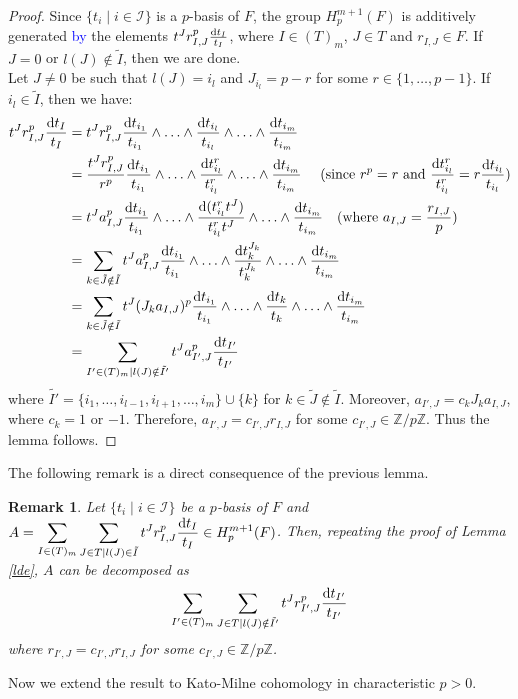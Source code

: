 \documentclass[times,10pt]{amsart}
\newcommand{\Z}{\ensuremath{\mathbb{Z}}}
\newcommand{\dd}{{\rm d}}
\newcommand{\I}{\ensuremath{\mathcal{I}}}
\newtheorem{rem}[thm]{Remark}%
\begin{document}
    \begin{proof}
         Since $\{ t_i\mid i\in \I\}$ is a $p$-basis of $F$, {the group $ H_p^{m+1}(F)$ is additively generated \textcolor{blue}{by} the  elements  $ t^J r^p_{I,J} \frac{\dd t_I}{t_I}$,} where  $ I\in (T)_m$,  $ J\in T$ and $r_{I,J}\in F$. If $J=0$ or $l(J)\notin \tilde{I}$, then we are done. \\
         Let  $J\neq 0$ be such that   $ l(J)=i_l$ and $ J_{i_l}=p-r$ for some $r\in \{1,\ldots,p-1\}$. If $i_l\in \tilde{I}$, then we  have:
         \begin{align*}
             t^J r^p_{I,J} \frac{\dd t_I}{t_I}&= t^J r^p_{I,J} \frac{\dd t_{i_1}}{t_{i_1}}\wedge \ldots\wedge \frac{\dd t_{i_l}}{t_{i_l}}\wedge \ldots\wedge \frac{\dd t_{i_m}}{t_{i_m}}\\&= \frac{t^J  r^p_{I,J}}{r^p} \frac{\dd t_{i_1}}{t_{i_1}}\wedge \ldots\wedge \frac{\dd t_{i_l}^r}{t^r_{i_l}}\wedge \ldots\wedge \frac{\dd t_{i_m}}{t_{i_m}}\quad \text{ (since $ r^p=r$ and $ \frac{\dd t^r_{i_l}}{t^r_{i_l}}= r\frac{\dd t_{i_l}}{t_{i_l}}$)}\\&= t^J {a^p_{I,J}} \frac{\dd t_{i_1}}{t_{i_1}}\wedge\ldots\wedge \frac{\dd (t^r_{i_l}t^J)}{t^r_{i_l}t^J}\wedge\ldots\wedge \frac{\dd t_{i_m}}{t_{i_m}}\quad \text{(where $a_{I,J}= \frac{r_{I,J}}{p}$)}\\&=\sum_{k\in \tilde{J}\notin \tilde{I}} t^Ja^p_{I,J} \frac{\dd t_{i_1}}{t_{i_1}}\wedge \ldots\wedge \frac{\dd t_k^{J_k}}{t_k^{J_k}}\wedge \ldots\wedge \frac{\dd t_{i_m}}{t_{i_m}}\\&=\sum_{k\in \tilde{J}\notin \tilde{I}}t^J (J_k a_{I,J})^p \frac{\dd t_{i_1}}{t_{i_1}}\wedge \ldots\wedge \frac{\dd t_k}{t_k}\wedge \ldots\wedge \frac{\dd t_{i_m}}{t_{i_m}}\\&= \sum_{I'\in (T)_m\mid l(J)\notin \tilde{I'}}  t^J a^p_{I',J}\frac{\dd t_{I'}}{t_{I'}}
         \end{align*}  where   $\tilde{I'}=\{ i_1,\ldots,i_{l-1},i_{l+1},  \ldots,i_m\}\cup \{k\}$ for $k\in \tilde{J}\notin \tilde{I}$. Moreover,  $ a_{I',J}=  c_kJ_k a_{I,J}$, where  $c_k=1$ or $-1$. Therefore,  $a_{I',J}= c_{I',J}r_{I,J}$ for some $c_{I',J}\in \Z/ p\Z$. Thus the lemma follows.
          \end{proof}
          The following remark is   a direct consequence of  the previous lemma. 
     \begin{rem}\label{rim}
         Let   $\{ t_i\mid i\in \I\}$  be a $p$-basis of $F$ and  $\displaystyle{ A= \sum_{I\in (T)_m}\sum_{J\in T\mid l(J)\in \tilde{I}} t^J  r^p_{I,J}\frac{\dd t_I}{t_I}\in H_p^{m+1}(F)}$. Then,  repeating the proof  of Lemma \ref{lde}, $A$ can be decomposed as $$ \sum_{I'\in (T)_m}\sum_{J\in T\mid l(J)\notin \tilde{I'}} t^J  r^p_{I',J} \frac{\dd t_{I'}}{t_{I'}} $$  where $ r_{I',J}= c_{I',J} r_{I,J}$ for some $c_{I',J}\in \Z/p\Z$.
     \end{rem}   
     Now we  extend the result \cite[Lemma 1.4]{AJ} {to Kato-Milne cohomology in characteristic $p>0$.}
\end{document}
